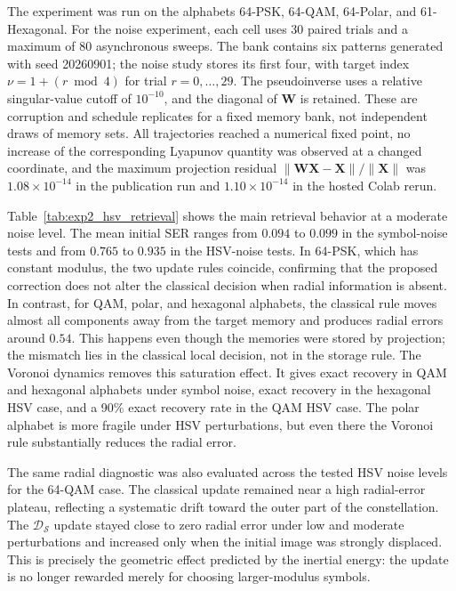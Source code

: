\documentclass[10pt,journal,letterpaper]{IEEEtran}
\begin{document}
The experiment was run on the alphabets 64-PSK, 64-QAM, 64-Polar, and
61-Hexagonal. For the noise experiment, each cell uses 30 paired trials and a
maximum of 80 asynchronous sweeps. The bank contains six patterns generated
with seed 20260901; the noise study stores its first four, with target index
$\nu=1+(r\bmod4)$ for trial $r=0,\ldots,29$. The pseudoinverse uses a relative
singular-value cutoff of $10^{-10}$, and the diagonal of $\boldsymbol{W}$ is
retained. These are corruption and schedule replicates for a fixed memory bank,
not independent draws of memory sets. All trajectories reached a numerical
fixed point, no increase of the corresponding Lyapunov quantity was observed
at a changed coordinate, and the maximum
projection residual $\|\boldsymbol{W}\boldsymbol{X}-\boldsymbol{X}\|/
\|\boldsymbol{X}\|$ was $1.08\times10^{-14}$ in the publication run and
$1.10\times10^{-14}$ in the hosted Colab rerun.

\begin{table}[!t]
\centering
\caption{Experiment~2 under moderate corruption, with $P=4$, $N=576$, and noise level $0.10$. Here, Sym. denotes random symbol replacement and HSV denotes perturbation before quantization.}
\label{tab:exp2_hsv_retrieval}
\scriptsize
\setlength{\tabcolsep}{2.1pt}
\resizebox{\columnwidth}{!}{%

}
\end{table}

Table~\ref{tab:exp2_hsv_retrieval} shows the main retrieval behavior at a
moderate noise level. The mean initial SER ranges from $0.094$ to $0.099$ in
the symbol-noise tests and from $0.765$ to $0.935$ in the HSV-noise tests. In
64-PSK, which has constant modulus, the two update rules coincide, confirming
that the proposed correction does not alter the classical decision when radial
information is absent. In contrast, for QAM, polar, and hexagonal alphabets,
the classical rule moves almost all components away from the target memory and
produces radial errors around $0.54$. This happens even though the memories
were stored by projection; the mismatch lies in the classical local decision,
not in the storage rule. The Voronoi dynamics removes this saturation effect.
It gives exact recovery in QAM and hexagonal alphabets under symbol noise,
exact recovery in the hexagonal HSV case, and a 90\% exact recovery rate in the
QAM HSV case. The polar alphabet is more fragile under HSV perturbations, but
even there the Voronoi rule substantially reduces the radial error.

The same radial diagnostic was also evaluated across the tested HSV noise
levels for the 64-QAM case. The classical update remained near a high
radial-error plateau, reflecting a systematic drift toward the outer part of
the constellation. The $\mathcal{D}_{\mathcal{S}}$ update stayed close to zero
radial error under low and moderate perturbations and increased only when the
initial image was strongly displaced. This is precisely the geometric effect
predicted by the inertial energy: the update is no longer rewarded merely for
choosing larger-modulus symbols.
\end{document}
